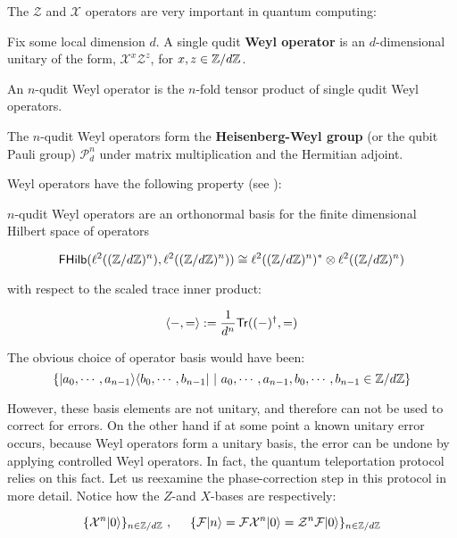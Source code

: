 The $\mathcal Z$ and $\mathcal X$ operators are very important in quantum computing:
\begin{definition}
\label{definition:begin}
Fix some local dimension $d$.
A single qudit {\bf Weyl operator} is an $d$-dimensional unitary of the form, $\mathcal{X}^{x}\mathcal{Z}^{z}$, for $x,z \in \mathbb{Z}/d\mathbb{Z}$.

An $n$-qudit Weyl operator is the $n$-fold tensor product of single qudit Weyl operators.

The $n$-qudit Weyl operators form the {\bf Heisenberg-Weyl group} (or the qubit Pauli group) $\mathcal{P}_d^n$ under matrix multiplication and the Hermitian adjoint.
\end{definition}
Weyl operators have the following property (see \cite[\S 10.3.1]{nielsen}):
\begin{lemma}
\label{lem:ueb}
$n$-qudit Weyl operators are an orthonormal basis for the finite dimensional  Hilbert space of operators

$$
\mathsf{FHilb}(\ell^2((\mathbb{Z}/d\mathbb{Z})^n), \ell^2((\mathbb{Z}/d\mathbb{Z})^n))
\cong \ell^2((\mathbb{Z}/d\mathbb{Z})^n)^*\otimes \ell^2((\mathbb{Z}/d\mathbb{Z})^n)
$$

with respect to the scaled trace inner product:

$$
\langle  -,= \rangle
:=
\dfrac{1}{d^n}\mathsf{Tr}((-)^\dag,=)
$$
\end{lemma}
The obvious choice of operator basis would have been:
$$
\{ |a_0, \cdots, a_{n-1} \rangle \langle  b_0,\cdots, b_{n-1} | \ | \ a_0,\cdots, a_{n-1},b_0,\cdots, b_{n-1} \in \mathbb{Z}/d\mathbb{Z} \}
$$

However, these basis elements are not unitary, and therefore can not be used to correct for errors.
On the other hand if at some point a known unitary error occurs,  because Weyl operators form a unitary basis, the error can be undone by applying controlled Weyl operators.
In fact, the quantum teleportation protocol relies on this fact.
Let us reexamine the phase-correction step in this protocol in more detail.
Notice how the $Z$-and $X$-bases are respectively: 

$$\{ \mathcal{X}^n|0\rangle \}_{n\in \Z/d\Z}
\ , \hspace{,5cm} \{\mathcal{F}|n\rangle=\mathcal{F} \mathcal{X}^n |0\rangle =\mathcal{Z}^n \mathcal{F} |0\rangle\}_{n\in \Z/d\Z}$$

